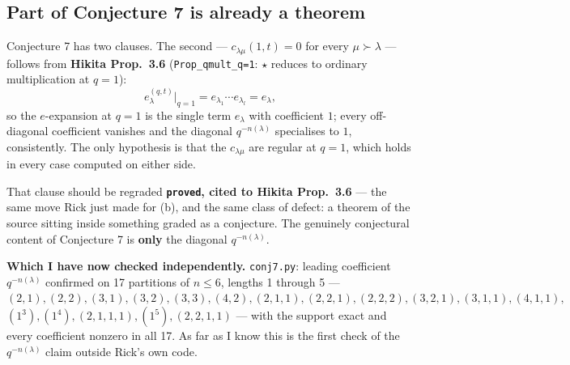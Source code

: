 \documentclass[11pt]{article}
\newcommand{\gr}[1]{\texttt{#1}}
\begin{document}
\subsection{Part of Conjecture 7 is already a theorem}
Conjecture 7 has two clauses. The second --- $c_{\lambda\mu}(1,t)=0$ for every
$\mu\succ\lambda$ --- follows from \textbf{Hikita Prop.\ 3.6} (\texttt{Prop\_qmult\_q=1}:
$\star$ reduces to ordinary multiplication at $q=1$):
\[e^{(q,t)}_\lambda\big|_{q=1}=e_{\lambda_1}\cdots e_{\lambda_l}=e_\lambda,\]
so the $e$-expansion at $q=1$ is the single term $e_\lambda$ with coefficient $1$; every
off-diagonal coefficient vanishes and the diagonal $q^{-n(\lambda)}$ specialises to $1$,
consistently. The only hypothesis is that the $c_{\lambda\mu}$ are regular at $q=1$, which
holds in every case computed on either side.

That clause should be regraded \textbf{\gr{proved}, cited to Hikita Prop.\ 3.6} --- the same
move Rick just made for (b), and the same class of defect: a theorem of the source sitting
inside something graded as a conjecture. The genuinely conjectural content of Conjecture 7 is
\textbf{only} the diagonal $q^{-n(\lambda)}$.

\textbf{Which I have now checked independently.} \texttt{conj7.py}: leading coefficient
$q^{-n(\lambda)}$ confirmed on 17 partitions of $n\le6$, lengths 1 through 5 ---
$(2,1),(2,2),(3,1),(3,2),(3,3),(4,2),(2,1,1),(2,2,1),(2,2,2),(3,2,1),(3,1,1),(4,1,1),$
$(1^3),(1^4),(2,1,1,1),(1^5),(2,2,1,1)$ --- with the support exact and every coefficient
nonzero in all 17. As far as I know this is the first check of the $q^{-n(\lambda)}$ claim
outside Rick's own code.
\end{document}
